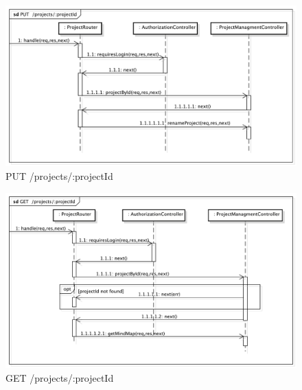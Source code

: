 \begin{center}
\begin{figure}[h]
\centering
\includegraphics[scale=0.35,keepaspectratio]{diagrammi/sequenza/BackEnd/putProj.pdf}
\caption{PUT  /projects/:projectId}
\end{figure}
\FloatBarrier
\end{center}
\label{getProj}
\begin{center}
\begin{figure}[h]
\centering
\includegraphics[scale=0.35,keepaspectratio]{diagrammi/sequenza/BackEnd/getProj.pdf}
\caption{GET  /projects/:projectId}
\end{figure}
\FloatBarrier
\end{center}
\label{putNod}

